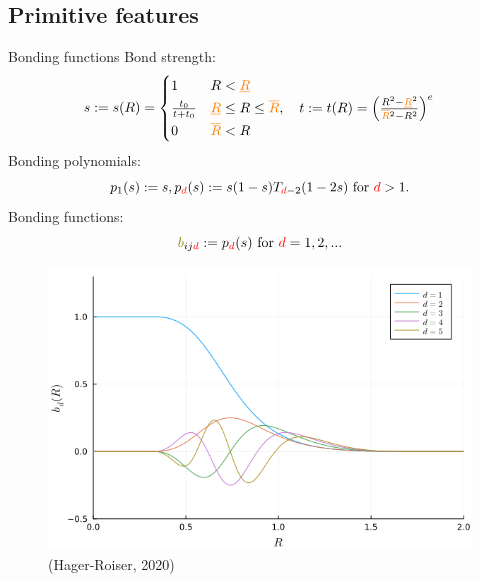 \documentclass{beamer}
\begin{document}
\subsection{Primitive features}
\begin{frame}{Bonding functions}
    \fontsize{6.5}{6}\selectfont
    Bond strength:
    \begin{equation}
         s := s(R) =
        \begin{cases}
            1 & R < {\color{orange}\underline{R}} \\
            \frac{t_0}{t + t_0} & {\color{orange}\underline{R}} \leq R \leq {\color{orange}\overline{R}}, \quad t := t(R) = \left(\frac{R^2 - {\color{orange}\underline{R}}^2}{{\color{orange}\overline{R}}^2 - R^2}\right)^e \\
            0 & {\color{orange}\overline{R}} < R
        \end{cases}
    \end{equation}
    Bonding polynomials:
    \begin{equation}
        p_1(s) := s, p_{\color{red}d}(s):= s(1-s)T_{{\color{red}d}-2}(1-2s) \text{ for } {\color{red}d} > 1.
    \end{equation}
    Bonding functions:
    \begin{equation}
        {\color{olive}b}_{ij{\color{red}d}} := p_{\color{red}d}(s)\text{ for }{\color{red}d}=1,2,...
    \end{equation}
    \begin{figure}[H]
        \centering
        \fontsize{6.5}{6}\selectfont
            \includegraphics[scale=0.3]{img/slide/bonding_functions.png}
        \caption{\fontsize{6}{6}\selectfont (Hager-Roiser, 2020)}
        \label{fig:bonding_functions}
    \end{figure}
\end{frame}
\end{document}

